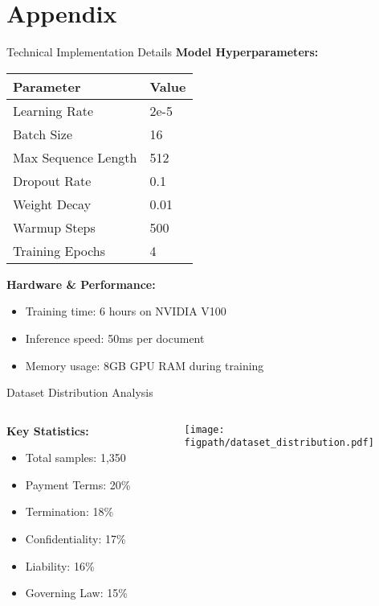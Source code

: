 
\section{Appendix}

\begin{frame}{Technical Implementation Details}
\textbf{Model Hyperparameters:}
\begin{table}[h]
\centering
\begin{tabular}{@{}ll@{}}
\toprule
\textbf{Parameter} & \textbf{Value} \\
\midrule
Learning Rate & 2e-5 \\
Batch Size & 16 \\
Max Sequence Length & 512 \\
Dropout Rate & 0.1 \\
Weight Decay & 0.01 \\
Warmup Steps & 500 \\
Training Epochs & 4 \\
\bottomrule
\end{tabular}
\end{table}

\vspace{0.5cm}
\textbf{Hardware \& Performance:}
\begin{itemize}
    \item Training time: 6 hours on NVIDIA V100
    \item Inference speed: 50ms per document
    \item Memory usage: 8GB GPU RAM during training
\end{itemize}
\end{frame}

\begin{frame}{Dataset Distribution Analysis}
\begin{columns}
\begin{column}{0.5\textwidth}
\textbf{Key Statistics:}
\begin{itemize}
    \item Total samples: 1,350
    \item Payment Terms: 20\%
    \item Termination: 18\%
    \item Confidentiality: 17\%
    \item Liability: 16\%
    \item Governing Law: 15\%
\end{itemize}
\end{column}
\begin{column}{0.5	\textwidth}
\begin{center}
\texttt{[image: \\figpath/dataset\_distribution.pdf]}
\end{center}
\end{column}
\end{columns}
\end{frame}

